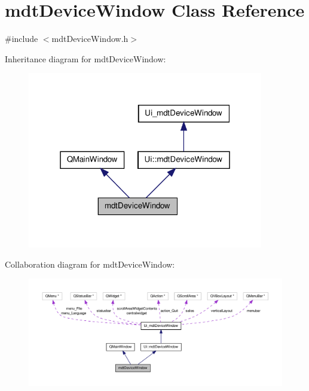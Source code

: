 \hypertarget{classmdt_device_window}{\section{mdt\-Device\-Window Class Reference}
\label{classmdt_device_window}
}


{\ttfamily \#include $<$mdt\-Device\-Window.\-h$>$}



Inheritance diagram for mdt\-Device\-Window\-:
\nopagebreak
\begin{figure}[H]
\begin{center}
\leavevmode
\includegraphics[width=292pt]{classmdt_device_window__inherit__graph}
\end{center}
\end{figure}


Collaboration diagram for mdt\-Device\-Window\-:
\nopagebreak
\begin{figure}[H]
\begin{center}
\leavevmode
\includegraphics[width=350pt]{classmdt_device_window__coll__graph}
\end{center}
\end{figure}
